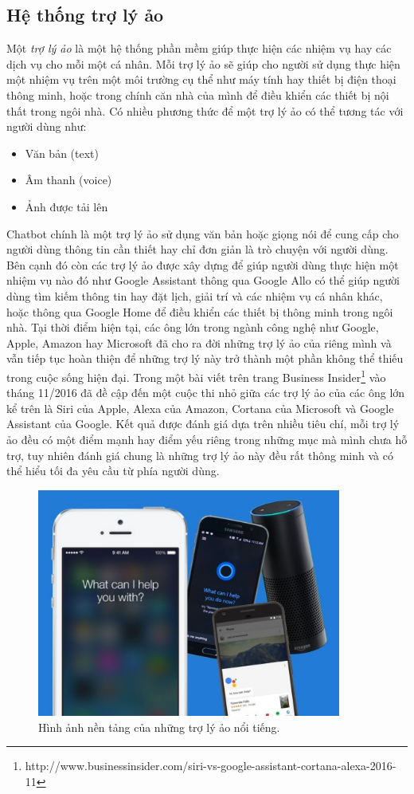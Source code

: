 \documentclass[12pt]{report}
\begin{document}
\subsection{Hệ thống trợ lý ảo}
Một \textit{trợ lý ảo} là một hệ thống phần mềm giúp thực hiện các nhiệm vụ hay các dịch vụ cho mỗi một cá nhân. Mỗi trợ lý ảo sẽ giúp cho người sử dụng thực hiện một nhiệm vụ trên một môi trường cụ thể như máy tính hay thiết bị điện thoại thông minh, hoặc trong chính căn nhà của mình để điều khiển các thiết bị nội thất trong ngôi nhà. Có nhiều phương thức để một trợ lý ảo có thể tương tác với người dùng như:

\begin{itemize}
	\item Văn bản (text)
	\item Âm thanh (voice)
	\item Ảnh được tải lên
\end{itemize}

Chatbot chính là một trợ lý ảo sử dụng văn bản hoặc giọng nói để cung cấp cho người dùng thông tin cần thiết hay chỉ đơn giản là trò chuyện với người dùng. Bên cạnh đó còn các trợ lý ảo được xây dựng để giúp người dùng thực hiện một nhiệm vụ nào đó như Google Assistant thông qua Google Allo có thể giúp người dùng tìm kiếm thông tin hay đặt lịch, giải trí và các nhiệm vụ cá nhân khác, hoặc thông qua Google Home để điều khiển các thiết bị thông minh trong ngôi nhà. Tại thời điểm hiện tại, các ông lớn trong ngành công nghệ như Google, Apple, Amazon hay Microsoft đã cho ra đời những trợ lý ảo của riêng mình và vẫn tiếp tục hoàn thiện để những trợ lý này trở thành một phần không thể thiếu trong cuộc sống hiện đại. Trong một bài viết trên trang Business Insider{\footnote{http://www.businessinsider.com/siri-vs-google-assistant-cortana-alexa-2016-11}} vào tháng 11/2016 đã đề cập đến một cuộc thi nhỏ giữa các trợ lý ảo của các ông lớn kể trên là Siri của Apple, Alexa của Amazon, Cortana của Microsoft và Google Assistant của Google. Kết quả được đánh giá dựa trên nhiều tiêu chí, mỗi trợ lý ảo đều có một điểm mạnh hay điểm yếu riêng trong những mục mà mình chưa hỗ trợ, tuy nhiên đánh giá chung là những trợ lý ảo này đều rất thông minh và có thể hiểu tối đa yêu cầu từ phía người dùng. 

\begin{figure}[H]
  \centering
    \includegraphics[width=10cm]{Pics/Chap1/virtual-assistants.png}
  \caption{Hình ảnh nền tảng của những trợ lý ảo nổi tiếng.}
\end{figure}
\end{document}
